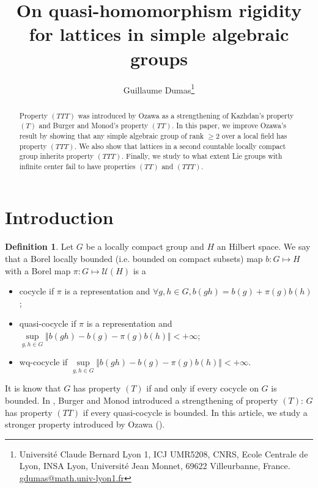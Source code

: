 \documentclass{article}
\theoremstyle{definition}
\newtheorem{definition}[theorem]{Definition}
\theoremstyle{remark}
\numberwithin{equation}{section}
\begin{document}
\title{On quasi-homomorphism rigidity for lattices in simple algebraic groups}
\author{Guillaume Dumas\footnote{Université Claude Bernard Lyon 1, ICJ UMR5208, CNRS, Ecole Centrale de Lyon, INSA Lyon, Université Jean Monnet,
69622 Villeurbanne, France. \href{mailto:gdumas@math.univ-lyon1.fr}{gdumas@math.univ-lyon1.fr}}}



\maketitle
\begin{abstract}
    Property $(TTT)$ was introduced by Ozawa as a strengthening of Kazhdan's property $(T)$ and Burger and Monod's property $(TT)$. In this paper, we improve Ozawa's result by showing that any simple algebraic group of rank $\geq 2$ over a local field has property $(TTT)$. We also show that lattices in a second countable locally compact group inherits property $(TTT)$. Finally, we study to what extent Lie groups with infinite center fail to have properties $(TT)$ and $(TTT)$.
\end{abstract}

\section{Introduction}
\begin{definition}
    Let $G$ be a locally compact group and $H$ an Hilbert space. We say that a Borel locally bounded (i.e. bounded on compact subsets) map $b:G\mapsto H$ with a Borel map $\pi:G\mapsto \mathcal{U}\left(H\right)$ is a\begin{itemize}
        \item cocycle if $\pi$ is a representation and $\forall g,h\in G, b(gh)=b(g)+\pi(g)b(h)$;
        \item quasi-cocycle if $\pi$ is a representation and $\underset{g,h\in G}{\sup} \Vert b(gh)-b(g)-\pi(g)b(h)\Vert <+\infty$;
        \item wq-cocycle if $\underset{g,h\in G}{\sup} \Vert b(gh)-b(g)-\pi(g)b(h)\Vert <+\infty$.
    \end{itemize}
\end{definition}

It is know that $G$ has property $\left(T\right)$ if and only if every cocycle on $G$ is bounded. In \cite{burgermonod}, Burger and Monod introduced a strengthening of property $\left(T\right)$: $G$ has property $(TT)$ if every quasi-cocycle is bounded. In this article, we study a stronger property introduced by Ozawa (\cite{Ozawa+2011+89+104}).
\end{document}
